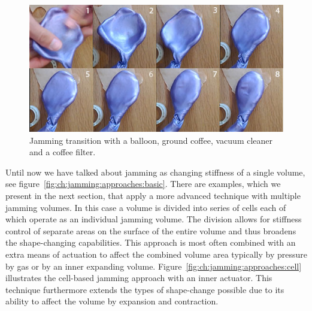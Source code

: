 \begin{figure}[h]
  \centering
  \includegraphics[width=.9\textwidth]{figures/jamming/jamming-transition}
  \caption[A jamming transition setup.]
  {Jamming transition with a balloon, ground coffee, vacuum cleaner and a coffee filter.}
  \label{fig:ch:jamming:jamming-transition}
\end{figure}

Until now we have talked about jamming as changing stiffness of a single volume, see figure~\ref{fig:ch:jamming:approaches:basic}.
There are examples, which we present in the next section, that apply a more advanced technique with multiple jamming volumes.
In this case a volume is divided into series of cells each of which operate as an individual jamming volume.
The division allows for stiffness control of separate areas on the surface of the entire volume and thus broadens the shape-changing capabilities.
This approach is most often combined with an extra means of actuation to affect the combined volume area typically by pressure by gas or by an inner expanding volume. 
Figure~\ref{fig:ch:jamming:approaches:cell} illustrates the cell-based jamming approach with an inner actuator.
This technique furthermore extends the types of shape-change possible due to its ability to affect the volume by expansion and contraction. 

